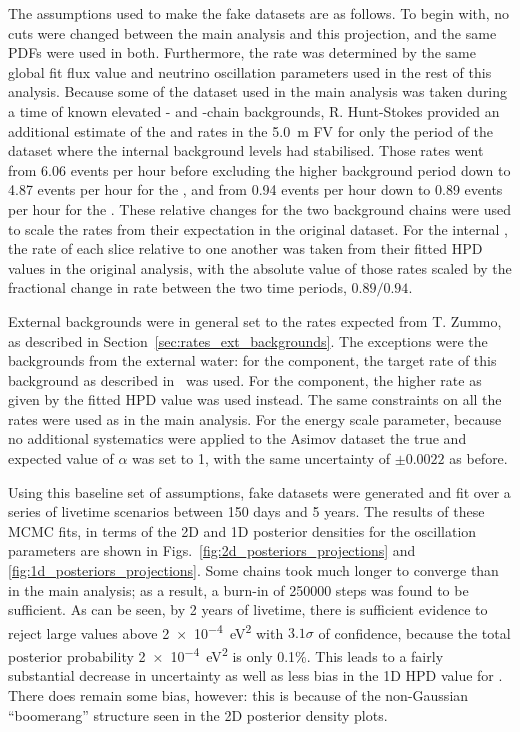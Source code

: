 The assumptions used to make the fake datasets are as follows. To begin with, no cuts were changed between the main analysis and this projection, and the same PDFs were used in both. Furthermore, the \beight{} rate was determined by the same global fit flux value and neutrino oscillation parameters used in the rest of this analysis. Because some of the dataset used in the main analysis was taken during a time of known elevated - and -chain backgrounds, R. Hunt-Stokes provided an additional estimate of the  and  rates in the \SI{5.0}{\metre} FV for only the period of the dataset where the internal background levels had stabilised. Those rates went from 6.06 events per hour before excluding the higher background period down to 4.87 events per hour for the , and from 0.94 events per hour down to 0.89 events per hour for the . These relative changes for the two background chains were used to scale the rates from their expectation in the original dataset. For the internal , the rate of each slice relative to one another was taken from their fitted HPD values in the original analysis, with the absolute value of those rates scaled by the fractional change in rate between the two time periods, $0.89/0.94$.

External backgrounds were in general set to the rates expected from T. Zummo, as described in Section~\ref{sec:rates_ext_backgrounds}. The exceptions were the backgrounds from the external water: for the  component, the target rate of this background as described in~\cite{andringaCurrentStatusFuture2016} was used. For the  component, the higher rate as given by the fitted HPD value was used instead. The same constraints on all the rates were used as in the main analysis. For the energy scale parameter, because no additional systematics were applied to the Asimov dataset the true and expected value of $\alpha$ was set to 1, with the same uncertainty of $\pm0.0022$ as before.

Using this baseline set of assumptions, fake datasets were generated and fit over a series of livetime scenarios between 150 days and 5 years. The results of these MCMC fits, in terms of the 2D and 1D posterior densities for the oscillation parameters are shown in Figs.~\ref{fig:2d_posteriors_projections} and \ref{fig:1d_posteriors_projections}. Some chains took much longer to converge than in the main analysis; as a result, a burn-in of \num{250000} steps was found to be sufficient. As can be seen, by 2 years of livetime, there is sufficient evidence to reject large \dmsq{} values above \SI{2e-4}{\eV\squared} with $3.1\sigma$ of confidence, because the total posterior probability \SI{2e-4}{\eV\squared} is only 0.1\%. This leads to a fairly substantial decrease in uncertainty as well as less bias in the 1D HPD value for \tonetwo{}. There does remain some bias, however: this is because of the non-Gaussian ``boomerang'' structure seen in the 2D posterior density plots.

